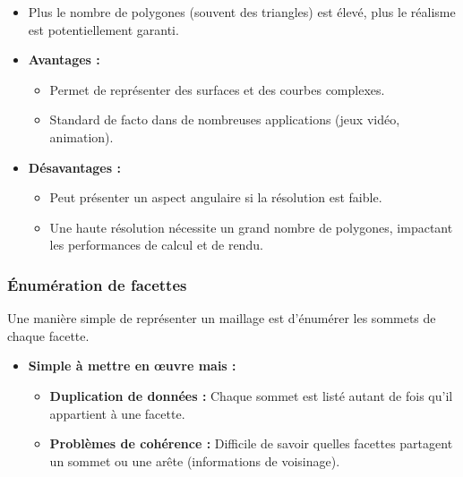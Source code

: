 \documentclass{article}
\begin{document}
\begin{itemize}
    \item Plus le nombre de polygones (souvent des triangles) est élevé, plus le réalisme est potentiellement garanti.
    \item \textbf{Avantages :}
        \begin{itemize}
            \item Permet de représenter des surfaces et des courbes complexes.
            \item Standard de facto dans de nombreuses applications (jeux vidéo, animation).
        \end{itemize}
    \item \textbf{Désavantages :}
        \begin{itemize}
            \item Peut présenter un aspect angulaire si la résolution est faible.
            \item Une haute résolution nécessite un grand nombre de polygones, impactant les performances de calcul et de rendu.
        \end{itemize}
\end{itemize}

\subsubsection{Énumération de facettes}

Une manière simple de représenter un maillage est d'énumérer les sommets de chaque facette.

\begin{itemize}
    \item \textbf{Simple à mettre en œuvre mais :}
        \begin{itemize}
            \item \textbf{Duplication de données :} Chaque sommet est listé autant de fois qu'il appartient à une facette.
            \item \textbf{Problèmes de cohérence :} Difficile de savoir quelles facettes partagent un sommet ou une arête (informations de voisinage).
        \end{itemize}
\end{itemize}
\end{document}
